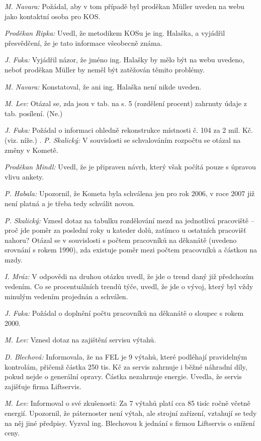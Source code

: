 \documentclass[a4paper,12pt,notitlepage,oneside]{article}
\begin{document}
\textit{M. Navara:} Požádal, aby v tom případě byl proděkan Müller uveden na webu jako kontaktní osoba pro KOS.

\textit{Proděkan Ripka:} Uvedl, že metodikem KOSu je ing. Halaška, a vyjádřil přesvědčení, že je tato informace všeobecně známa.

\textit{J. Fuka:} Vyjádřil názor, že jméno ing. Halašky by mělo být na webu uvedeno, neboť proděkan Müller by neměl být zatěžován těmito problémy.

\textit{M. Navara:} Konstatoval, že ani ing. Halaška není nikde uveden.

\textit{M. Lev:} Otázal se, zda jsou v tab. na s. 5 (rozdělení procent) zahrnuty údaje z tab. posílení. (Ne.)

\textit{J. Fuka:} Požádal o informaci ohledně rekonstrukce místnosti č. 104 za 2 mil. Kč. (viz. níže.)
.
\textit{P. Skalický:} V souvislosti se schvalováním rozpočtu se otázal na změny v Kometě.

\textit{Proděkan Mindl:} Uvedl, že je připraven návrh, který však počítá pouze s úpravou vlivu ankety.

\textit{P. Habala:} Upozornil, že Kometa byla schválena jen pro rok 2006, v roce 2007 již není platná a je třeba tedy schválit novou.

\textit{P. Skalický:} Vznesl dotaz na tabulku rozdělování mezd na jednotlivá pracoviště – proč jde poměr za poslední roky u kateder dolů, zatímco u ostatních pracovišť nahoru? Otázal se v souvislosti s počtem pracovníků na děkanátě (uvedeno srovnání s rokem 1990), zda existuje poměr mezi počtem pracovníků a částkou na mzdy.

\textit{I. Mráz:} V odpovědi na druhou otázku uvedl, že jde o trend daný již předchozím vedením. Co se procentuálních trendů týče, uvedl, že jde o vývoj, který byl vždy minulým vedením projednán a schválen.

\textit{J. Fuka:} Požádal o doplnění počtu pracovníků na děkanátě o sloupec s rokem 2000.

\textit{M. Lev:} Vznesl dotaz na zajištění servisu výtahů.

\textit{D. Blechová:} Informovala, že na FEL je 9 výtahů, které podléhají pravidelným kontrolám, přičemž částka 250 tis. Kč za servis zahrnuje i běžné náhradní díly, pokud nejde o generální opravy. Částka nezahrnuje energie. Uvedla, že servis zajišťuje firma Liftservis.

\textit{M. Lev:} Informoval o své zkušenosti: Za 7 výtahů platí cca 85 tisíc ročně včetně energií. Upozornil, že páternoster není výtah, ale strojní zařízení, vztahují se tedy na něj jiné předpisy. Vyzval ing. Blechovou k jednání s firmou Liftservis o snížení ceny.
\end{document}
